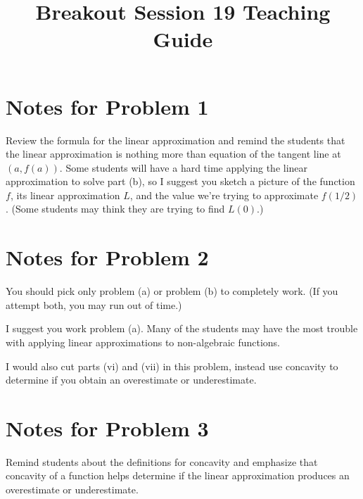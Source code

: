 \documentclass[handout,nooutcomes]{ximera}
\title{Breakout Session 19 Teaching Guide}
\begin{document}
\begin{abstract}

  
\end{abstract}
\maketitle

\section{Notes for Problem 1}
Review the formula for the linear approximation and remind the students that the linear approximation is nothing more than equation of the tangent line at $(a,f(a))$.
Some students will have a hard time applying the linear approximation to solve part (b), so I suggest you sketch a picture of the function $f$, its linear approximation $L$, and the value we're trying to approximate $f(1/2)$.
(Some students may think they are trying to find $L(0)$.)

\section{Notes for Problem 2}
You should pick only problem (a) or problem (b) to completely work.
(If you attempt both, you may run out of time.)

I suggest you work problem (a).
Many of the students may have the most trouble with applying linear approximations to non-algebraic functions.

I would also cut parts (vi) and (vii) in this problem, instead use concavity to determine if you obtain an overestimate or underestimate.

\section{Notes for Problem 3}
Remind students about the definitions for concavity and emphasize that concavity of a function helps determine if the  linear approximation produces an overestimate or underestimate.
\end{document}
